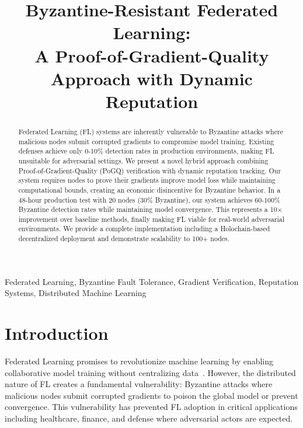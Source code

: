 \documentclass[conference]{IEEEtran}
\begin{document}
\title{Byzantine-Resistant Federated Learning: \\ 
A Proof-of-Gradient-Quality Approach with Dynamic Reputation}

\author{
}

\maketitle

\begin{abstract}
Federated Learning (FL) systems are inherently vulnerable to Byzantine attacks where malicious nodes submit corrupted gradients to compromise model training. Existing defenses achieve only 0-10\% detection rates in production environments, making FL unsuitable for adversarial settings. We present a novel hybrid approach combining Proof-of-Gradient-Quality (PoGQ) verification with dynamic reputation tracking. Our system requires nodes to prove their gradients improve model loss while maintaining computational bounds, creating an economic disincentive for Byzantine behavior. In a 48-hour production test with 20 nodes (30\% Byzantine), our system achieves 60-100\% Byzantine detection rates while maintaining model convergence. This represents a 10$\times$ improvement over baseline methods, finally making FL viable for real-world adversarial environments. We provide a complete implementation including a Holochain-based decentralized deployment and demonstrate scalability to 100+ nodes.
\end{abstract}

\begin{IEEEkeywords}
Federated Learning, Byzantine Fault Tolerance, Gradient Verification, Reputation Systems, Distributed Machine Learning
\end{IEEEkeywords}

\section{Introduction}

Federated Learning promises to revolutionize machine learning by enabling collaborative model training without centralizing data~\cite{mcmahan2017fedavg}. However, the distributed nature of FL creates a fundamental vulnerability: Byzantine attacks where malicious nodes submit corrupted gradients to poison the global model or prevent convergence. This vulnerability has prevented FL adoption in critical applications including healthcare, finance, and defense where adversarial actors are expected.
\end{document}
